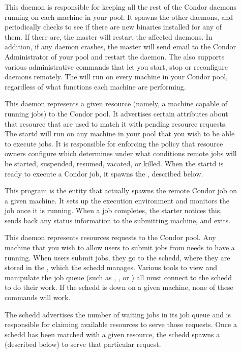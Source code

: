 \begin{description} 

\item[] This daemon is responsible for keeping all the
rest of the Condor daemons running on each machine in your pool.  It
spawns the other daemons, and periodically checks to see if there are
new binaries installed for any of them.  If there are, the master will
restart the affected daemons.  In addition, if any daemon crashes, the
master will send email to the Condor Administrator of your pool and
restart the daemon.  The  also supports various
administrative commands that let you start, stop or reconfigure
daemons remotely.  The  will run on every machine in
your Condor pool, regardless of what functions each machine are
performing.  

\item[] This daemon represents a given resource
(namely, a machine capable of running jobs) to the Condor pool.  It
advertises certain attributes about that resource that are used to
match it with pending resource requests.  The startd will run on any
machine in your pool that you wish to be able to execute jobs.  It is
responsible for enforcing the policy that resource owners configure
which determines under what conditions remote jobs will be started,
suspended, resumed, vacated, or killed.  When the startd is ready to
execute a Condor job, it spawns the , described below.

\item[] This program is the entity that actually
spawns the remote Condor job on a given machine.  It sets up the
execution environment and monitors the job once it is running.  When a
job completes, the starter notices this, sends back any status
information to the submitting machine, and exits.

\item[] This daemon represents resources requests to
the Condor pool.  Any machine that you wish to allow users to submit
jobs from needs to have a  running.  When users submit
jobs, they go to the schedd, where they are stored in the , which the schedd manages.  Various tools to view and
manipulate the job queue (such as , , or
) all must connect to the schedd to do their work.  If the
schedd is down on a given machine, none of these commands will work.  

The schedd advertises the number of waiting jobs in its job queue and
is responsible for claiming available resources to serve those
requests.  Once a schedd has been matched with a given resource, the
schedd spawns a  (described below) to serve that
particular request.


\end{description}
